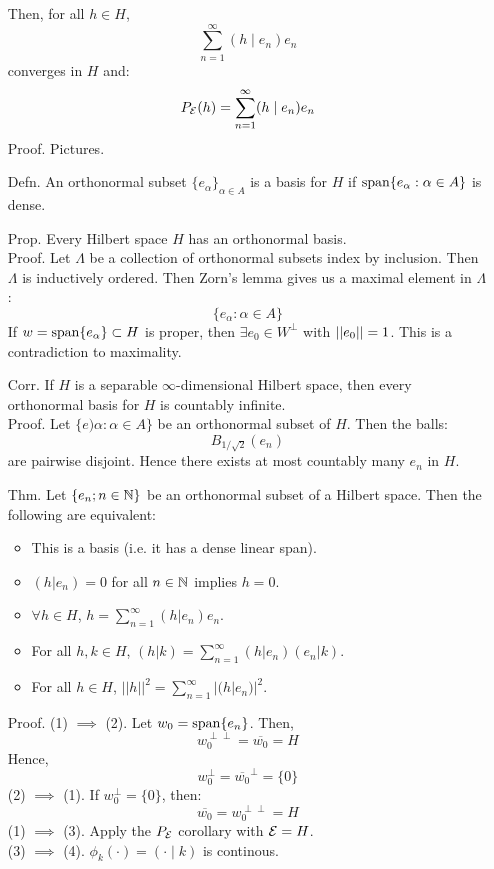 \documentclass[12pt]{article}
\begin{document}
\begin{itemize}
    Then, for all $h \in H$, 
    \[ \sum_{n=1}^\infty (h\mid e_n)e_n\]
    converges in $H$ and: 
    \[ P_{\mathcal{E}} (h) = \sum_{n=1}^\infty (h\mid e_n)e_n\]
    Proof. Pictures. 
    \item[Defn.] An orthonormal subset $\{e_\alpha\}_{\alpha \in A}$ is a basis for $H$ if $\operatorname{span}\{e_\alpha : \alpha \in A\}$ is dense. 
    \item[Prop.] Every Hilbert space $H$ has an orthonormal basis. \\
    Proof. Let $\Lambda$ be a collection of orthonormal subsets index by inclusion. Then $\Lambda$ is inductively ordered. Then Zorn's lemma gives us a maximal element in $\Lambda$: 
    \[ \{e_\alpha : \alpha \in A\}\]
    If $w = \operatorname{span}\{e_\alpha\} \subset H$ is proper, then $\exists e_0 \in W^\perp$ with $\left\vert\left\vert e_0\right\vert\right\vert = 1$. This is a contradiction to maximality. 
    \item[Corr.] If $H$ is a separable $\infty$-dimensional Hilbert space, then every orthonormal basis for $H$ is countably infinite. \\
    Proof. Let $\{e)\alpha : \alpha \in A\}$ be an orthonormal subset of $H$. Then the balls: 
    \[ B_{1/\sqrt2}(e_n)\]
    are pairwise disjoint. Hence there exists at most countably many $e_n$ in $H$.
    \item[Thm.] Let $\{e_n ; n \in \mathbb N\}$ be an orthonormal subset of a Hilbert space. Then the following are equivalent:
    \begin{itemize}
        \item This is a basis (i.e. it has a dense linear span).
        \item $(h|e_n) = 0$ for all $n \in \mathbb N$ implies $h = 0$.
        \item $\forall h \in H$, $h = \sum_{n=1}^\infty (h|e_n)e_n$.
        \item For all $h, k \in H$, $(h|k) = \sum_{n=1}^\infty (h|e_n)(e_n|k)$.
        \item For all $h \in H$, $||h||^2 = \sum_{n=1}^\infty |(h|e_n)|^2$.
    \end{itemize}
    Proof. (1) $\implies$ (2). Let $w_0 = \operatorname{span}\{e_n\}$. Then, 
    \[ w_0^{\perp\perp} = \overline{w_0} = H \]
    Hence, 
    \[ w_0^\perp = \overline{w_0}^\perp = \{0\}\]
    (2) $\implies$ (1). If $w_0^\perp = \{0\}$, then: 
    \[ \overline{w_0} = w_0^{\perp\perp} = H\]
    (1) $\implies$ (3). Apply the $P_{\mathcal{E}}$ corollary with $\mathcal{E} = H$. \\
    (3) $\implies$ (4). $\phi_k(\cdot) = (\cdot \mid k)$ is continous. \\

\end{itemize}
\end{document}

